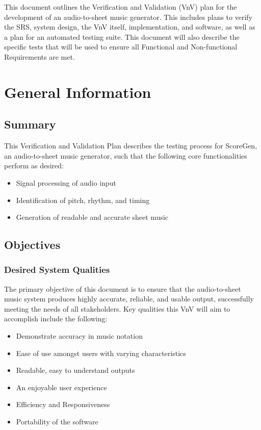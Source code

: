 \documentclass[12pt, titlepage]{article}
\begin{document}

This document outlines the Verification and Validation (VnV) plan for the development 
of an audio-to-sheet music generator. This includes plans to verify the SRS, system 
design, the VnV itself, implementation, and software, as well as a plan for an automated 
testing suite. This document will also describe the specific tests that will be used to 
ensure all Functional and Non-functional Requirements are met.

\section{General Information}

\subsection{Summary}

This Verification and Validation Plan describes the testing process for ScoreGen, an 
audio-to-sheet music generator, such that the following core functionalities perform as desired:
\begin{itemize}
  \item Signal processing of audio input
  \item Identification of pitch, rhythm, and timing
  \item Generation of readable and accurate sheet music
\end{itemize}

\subsection{Objectives}

\subsubsection{Desired System Qualities}

The primary objective of this document is to ensure that the audio-to-sheet music system produces 
highly accurate, reliable, and usable output, successfully meeting the needs of all stakeholders. 
Key qualities this VnV will aim to accomplish include the following:
\begin{itemize}
  \item Demonstrate accuracy in music notation
  \item Ease of use amongst users with varying characteristics
  \item Readable, easy to understand outputs
  \item An enjoyable user experience
  \item Efficiency and Responsiveness
  \item Portability of the software
\end{itemize}
\end{document}
